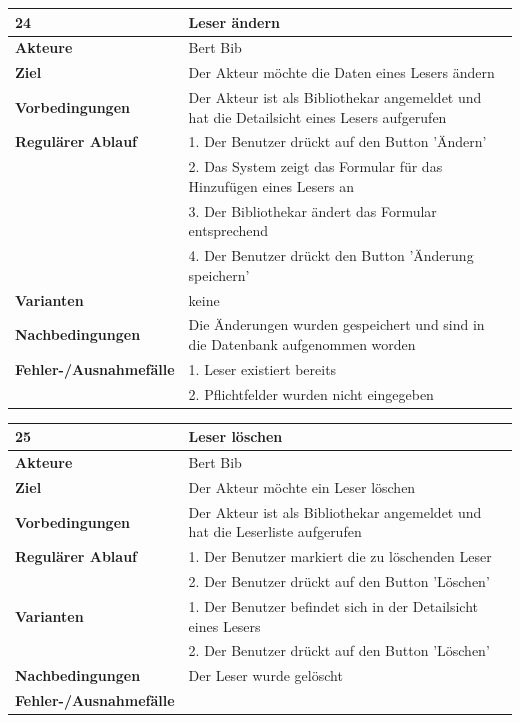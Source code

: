 \documentclass[fontsize=12pt,paper=a4,twoside]{scrartcl}
\begin{document}
\newpage
\begin{table}[htbp]
\label{24}
\begin{tabular}{|l|p{10cm}|}
\hline 
\textbf{24} & \textbf{Leser ändern} \\ \hline
\textbf{Akteure} & Bert Bib\\ \hline
\textbf{Ziel} & Der Akteur möchte die Daten eines Lesers ändern \\ \hline
\textbf{Vorbedingungen} & Der Akteur ist als Bibliothekar angemeldet und hat die Detailsicht eines 
Lesers aufgerufen  \\ \hline
\textbf{Regulärer Ablauf} & 
1. Der Benutzer drückt auf den Button 'Ändern' \\
&2. Das System zeigt das Formular für das Hinzufügen eines Lesers an\\
&3. Der Bibliothekar ändert das Formular entsprechend\\
&4. Der Benutzer drückt den Button 'Änderung speichern'\\
\hline
\textbf{Varianten} & 
keine \\ \hline
\textbf{Nachbedingungen} & Die Änderungen wurden gespeichert und sind in die Datenbank 
aufgenommen worden\\ \hline
\textbf{Fehler-/Ausnahmefälle} & 1. Leser existiert bereits\\
&2. Pflichtfelder wurden nicht eingegeben\\
\hline
\end{tabular}
\end{table}

\newpage
\begin{table}[htbp]
\label{25}
\begin{tabular}{|l|p{10cm}|}
\hline 
\textbf{25} & \textbf{Leser löschen} \\ \hline
\textbf{Akteure} & Bert Bib\\ \hline
\textbf{Ziel} & Der Akteur möchte ein Leser löschen \\ \hline
\textbf{Vorbedingungen} & Der Akteur ist als Bibliothekar angemeldet und hat die Leserliste 
aufgerufen  \\ \hline
\textbf{Regulärer Ablauf} & 
1. Der Benutzer markiert die zu löschenden Leser\\
&2. Der Benutzer drückt auf den Button 'Löschen' \\
\hline
\textbf{Varianten} & 
1. Der Benutzer befindet sich in der Detailsicht eines Lesers\\
&2. Der Benutzer drückt auf den Button 'Löschen' \\ \hline
\textbf{Nachbedingungen} & Der Leser wurde gelöscht \\ \hline
\textbf{Fehler-/Ausnahmefälle} & \\
\hline
\end{tabular}
\end{table}
\end{document}
